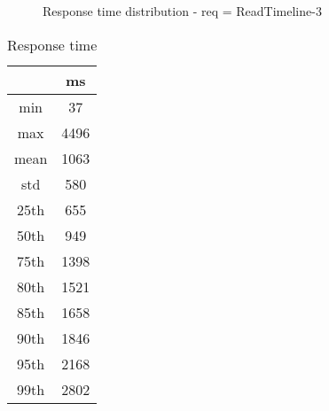 \begin{minipage}{0.75\linewidth}
\begin{figure}[h]
\begin{adjustbox}{max width=1.0\linewidth, keepaspectratio}
  \end{adjustbox}
  \caption{Response time distribution - req = ReadTimeline-3}
\end{figure}
\end{minipage}\hfill\begin{minipage}{0.18\linewidth}
\begin{table}[h]
\begin{tabular}{|cc|}
\hline
\textbf{} & \textbf{ms}\\ \hline
 \Xhline{0.005\arrayrulewidth}
min & 37\\
 \Xhline{0.005\arrayrulewidth}
max & 4496\\
 \Xhline{0.005\arrayrulewidth}
mean & 1063\\
 \Xhline{0.005\arrayrulewidth}
std & 580\\
\hline
\hline
 \Xhline{0.005\arrayrulewidth}
25th & 655\\
 \Xhline{0.005\arrayrulewidth}
50th & 949\\
 \Xhline{0.005\arrayrulewidth}
75th & 1398\\
 \Xhline{0.005\arrayrulewidth}
80th & 1521\\
 \Xhline{0.005\arrayrulewidth}
85th & 1658\\
 \Xhline{0.005\arrayrulewidth}
90th & 1846\\
 \Xhline{0.005\arrayrulewidth}
95th & 2168\\
 \Xhline{0.005\arrayrulewidth}
99th & 2802\\
\hline
\end{tabular}
\caption{Response time}
\end{table}
\end{minipage}\hfill